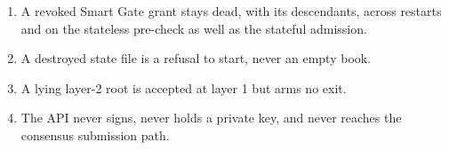 \documentclass{article}
\begin{document}
\begin{enumerate}
  cannot replay a nonce past the single commit point) and, on key-bound
  grants, the proof travels with the admission request; local re-verification
  runs at the returned authoritative height, and an allow without one is an
  error; the raw unsigned path does not exist.
\item A revoked Smart Gate grant stays dead, with its descendants, across
  restarts and on the stateless pre-check as well as the stateful admission.
\item A destroyed state file is a refusal to start, never an empty book.
\item A lying layer-2 root is accepted at layer 1 but arms no exit.
\item The API never signs, never holds a private key, and never reaches the
  consensus submission path.
\end{enumerate}
\end{document}
